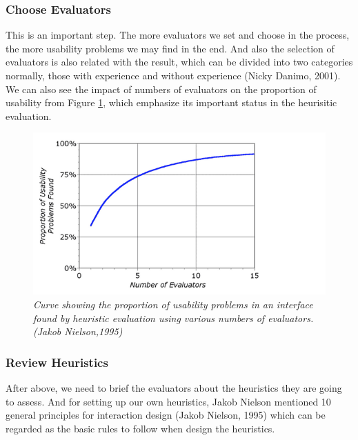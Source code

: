 \documentclass[twocolumn]{article}
\begin{document}
\subsubsection{Choose Evaluators}
This is an important step. The more evaluators we set and choose in the process, the more usability problems we may find in the end. And also the selection of evaluators is also related with the result, which can be divided into two categories normally, those with experience and without experience (Nicky Danimo, 2001). We can also see the impact of numbers of evaluators on the proportion of usability from Figure \ref{fig:usability-problems-found}, which emphasize its important status in the heurisitic evaluation.

\begin{figure}
  \centering
  \includegraphics[width=\columnwidth, clip=true, trim=0 0 140 0]{fig/usability-problems-found.png}
  \caption{\emph{Curve showing the proportion of usability problems in an interface found by heuristic evaluation using various numbers of evaluators. (Jakob Nielson,1995)}}
  \label{fig:usability-problems-found}
\end{figure}

\subsubsection{Review Heuristics}
After above, we need to brief the evaluators about the heuristics they are going to assess. And for setting up our own heuristics, Jakob Nielson mentioned 10 general principles for interaction design (Jakob Nielson, 1995) which can be regarded as the basic rules to follow when design the heuristics.
\end{document}
